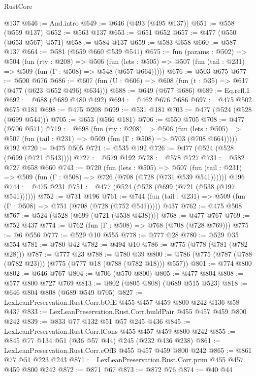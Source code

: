 \begin{lexlean}{RustCore}
\begin{coremodule}
    @137
@646 := And.intro
@649 := @646 (@493 (@495 @137))
@651 := @558 (@559 @137)
@652 := @563 @137
@653 := @651 @652
@657 := @477 (@550 (@653 @567) @571)
@658 := @584 @137
@659 := @583 @658
@660 := @587 @137
@664 := @581 (@659 @660 @539 @541)
@675 := fun (params : @502) =>
  @504
    (fun (rty : @208) =>
    @506
      (fun (lets : @505) => @507 (fun (tail : @231) => @509 (fun (Γ : @508) => @548 (@657 @664)))))
@676 := @503 @675
@677 := @500 @676
@686 := @607 (fun (U : @606) => @608 (fun (t : @35) => @617 (@477 (@623 @652 @496) @634)))
@688 := @649 (@677 @686)
@689 := Eq.refl.{1}
@692 := @688 (@689 @480 @492)
@694 := @462 @676 @686
@697 := @475 @502 @675 @181
@698 := @475 @208
@699 := @531 @181
@703 := @477 (@524 (@528 (@699 @544)))
@705 := @653 (@566 @181)
@706 := @550 @705
@708 := @477 (@706 @571)
@719 := @698
    (fun (rty : @208) =>
    @506
      (fun (lets : @505) => @507 (fun (tail : @231) => @509 (fun (Γ : @508) => @703 (@708 @664)))))
    @192
@720 := @475 @505
@721 := @535 @192
@726 := @477 (@524 (@528 (@699 (@721 @543))))
@727 := @579 @192
@728 := @578 @727
@731 := @582 @727 @658 @660
@743 := @720
    (fun (lets : @505) =>
    @507 (fun (tail : @231) => @509 (fun (Γ : @508) => @726 (@708 (@728 (@731 @539 @541))))))
    @196
@744 := @475 @231
@751 := @477 (@524 (@528 (@699 (@721 (@538 (@197 @541))))))
@752 := @731 @196
@761 := @744 (fun (tail : @231) => @509 (fun (Γ : @508) => @751 (@708 (@728 (@752 @541))))) @437
@762 := @475 @508
@767 := @524 (@528 (@699 (@721 (@538 @438))))
@768 := @477 @767
@769 := @752 @437
@774 := @762 (fun (Γ : @508) => @768 (@708 (@728 @769)))
@775 := @6 @556
@777 := @529 @10 @555
@778 := @777 @28
@780 := @529 @35 @554
@781 := @780 @42
@782 := @494 @10
@786 := @775 (@778 (@781 (@782 @28)))
@787 := @777 @23
@788 := @780 @39
@800 := @786 (@775 (@787 (@788 (@782 @23))) (@775 (@777 @18 (@788 (@782 @18))) @557))
@801 := @774 @800
@802 := @646 @767
@804 := @706 (@570 @800)
@805 := @477 @804
@808 := @577 @800 @727 @769
@813 := @802 (@805 @808) (@689 @515 @523)
@818 := @646 @804 @808 (@689 @549 @705)
@827 := LexLeanPreservation.Rust.Corr.bOfE @455 @457 @459 @800 @242 @136 @58 @437
@833 := LexLeanPreservation.Rust.Corr.buildPair @455 @457 @459 @800 @242
@839 := @833 @77 @132 @51 @57 @245 @436
@845 := LexLeanPreservation.Rust.Corr.lCons @455 @457 @459 @800 @242
@855 := @845 @77 @134 @51 (@36 @57 @44) @245 (@232 @436 @238)
@861 := LexLeanPreservation.Rust.Corr.eOfB @455 @457 @459 @800 @242
@865 := @861 @77 @51 @223 @243
@871 := LexLeanPreservation.Rust.Corr.prim @455 @457 @459 @800 @242
@872 := @871 @67
@873 := @872 @76
@874 := @40 @44

\end{coremodule}
\end{lexlean}
